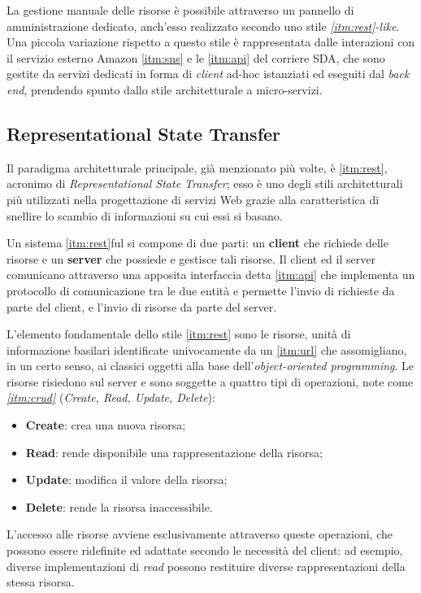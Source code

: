 La gestione manuale delle risorse è possibile attraverso un pannello di amministrazione dedicato, anch'esso realizzato secondo uno stile \textit{\ref{itm:rest}-like}. Una piccola variazione rispetto a questo stile è rappresentata dalle interazioni con il servizio esterno Amazon \ref{itm:sns} e le \ref{itm:api} del corriere SDA, che sono gestite da servizi dedicati in forma di \textit{client} ad-hoc istanziati ed eseguiti dal \textit{back end}, prendendo spunto dallo stile architetturale a micro-servizi.

\subsection{Representational State Transfer}
Il paradigma architetturale principale, già menzionato più volte, è \ref{itm:rest}, acronimo di \textit{Representational State Transfer}; esso è uno degli stili architetturali più utilizzati nella progettazione di servizi Web grazie alla caratteristica di snellire lo scambio di informazioni su cui essi si basano.

Un sistema \ref{itm:rest}ful si compone di due parti: un \textbf{client} che richiede delle risorse e un \textbf{server} che possiede e gestisce tali risorse. Il client ed il server comunicano attraverso una apposita interfaccia detta \ref{itm:api} che implementa un protocollo di comunicazione tra le due entità e permette l'invio di richieste da parte del client, e l'invio di risorse da parte del server.

L'elemento fondamentale dello stile \ref{itm:rest} sono le risorse, unità di informazione basilari identificate univocamente da un \ref{itm:url} che assomigliano, in un certo senso, ai classici oggetti alla base dell'\textit{object-oriented programming}. Le risorse risiedono sul server e sono soggette a quattro tipi di operazioni, note come \textit{\ref{itm:crud}} (\textit{Create, Read, Update, Delete}):
\begin{itemize}
    \item \textbf{Create}: crea una nuova risorsa;
    \item \textbf{Read}: rende disponibile una rappresentazione della risorsa;
    \item \textbf{Update}: modifica il valore della risorsa;
    \item \textbf{Delete}: rende la risorsa inaccessibile.
\end{itemize}

L'accesso alle risorse avviene esclusivamente attraverso queste operazioni, che possono essere ridefinite ed adattate secondo le necessità del client: ad esempio, diverse implementazioni di \textit{read} possono restituire diverse rappresentazioni della stessa risorsa.

